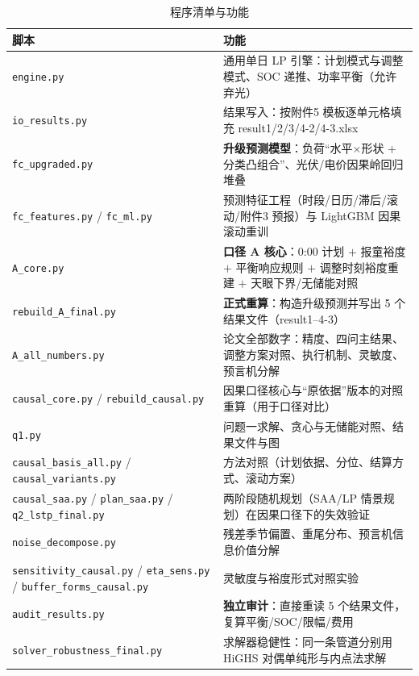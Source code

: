 \documentclass[12pt,a4paper,fontset=fandol]{ctexart}
\begin{document}
\begin{table}[htbp]
\centering
\caption{程序清单与功能}
\label{tab:code}
\begin{tabularx}{\textwidth}{@{}p{4.6cm}X@{}}
\toprule
脚本 & 功能 \\
\midrule
\texttt{engine.py} & 通用单日 LP 引擎\nobreak：计划模式与调整模式\nobreak、SOC 递推\nobreak、功率平衡（允许弃光\nobreak） \\
\texttt{io\_results.py} & 结果写入\nobreak：按附件5 模板逐单元格填充 result1/2/3/4-2/4-3.xlsx \\
\texttt{fc\_upgraded.py} & \textbf{升级预测模型}\nobreak：负荷“水平$\times$形状 + 分类凸组合\nobreak”\nobreak、光伏/电价因果岭回归堆叠 \\
\texttt{fc\_features.py} / \texttt{fc\_ml.py} & 预测特征工程（时段/日历/滞后/滚动/附件3 预报\nobreak）与 LightGBM 因果滚动重训 \\
\texttt{A\_core.py} & \textbf{口径 A 核心}\nobreak：0:00 计划 $+$ 报童裕度 $+$ 平衡响应规则 $+$ 调整时刻裕度重建 $+$ 天眼下界/无储能对照 \\
\texttt{rebuild\_A\_final.py} & \textbf{正式重算}\nobreak：构造升级预测并写出 5 个结果文件（result1--4-3\nobreak） \\
\texttt{A\_all\_numbers.py} & 论文全部数字\nobreak：精度\nobreak、四问主结果\nobreak、调整方案对照\nobreak、执行机制\nobreak、灵敏度\nobreak、预言机分解 \\
\texttt{causal\_core.py} / \texttt{rebuild\_causal.py} & 因果口径核心与“原依据\nobreak”版本的对照重算（用于口径对比\nobreak） \\
\texttt{q1.py} & 问题一求解\nobreak、贪心与无储能对照\nobreak、结果文件与图 \\
\texttt{causal\_basis\_all.py} / \texttt{causal\_variants.py} & 方法对照（计划依据\nobreak、分位\nobreak、结算方式\nobreak、滚动方案\nobreak） \\
\texttt{causal\_saa.py} / \texttt{plan\_saa.py} / \texttt{q2\_lstp\_final.py} & 两阶段随机规划（SAA/LP 情景规划\nobreak）在因果口径下的失效验证 \\
\texttt{noise\_decompose.py} & 残差季节偏置\nobreak、重尾分布\nobreak、预言机信息价值分解 \\
\texttt{sensitivity\_causal.py} / \texttt{eta\_sens.py} / \texttt{buffer\_forms\_causal.py} & 灵敏度与裕度形式对照实验 \\
\texttt{audit\_results.py} & \textbf{独立审计}\nobreak：直接重读 5 个结果文件\nobreak，复算平衡/SOC/限幅/费用 \\
\texttt{solver\_robustness\_\allowbreak final.py} & 求解器稳健性\nobreak：同一条管道分别用 HiGHS 对偶单纯形与内点法求解 \\

\end{tabularx}
\end{table}
\end{document}
